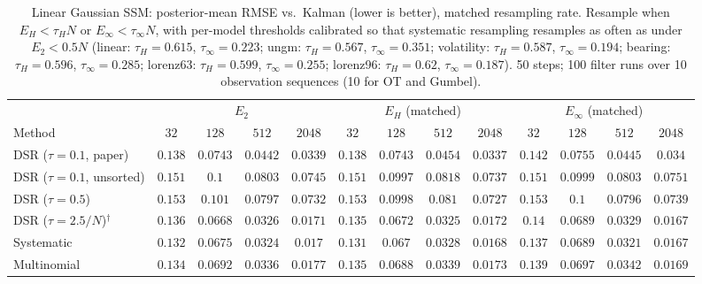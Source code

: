 \begin{table}[ht]
\centering
\small
\caption{Linear Gaussian SSM: posterior-mean RMSE vs.\ Kalman (lower is better), matched resampling rate. Resample when $E_H<\tau_HN$ or $E_\infty<\tau_\infty N$, with per-model thresholds calibrated so that systematic resampling resamples as often as under $E_2<0.5N$ (linear: $\tau_H{=}0.615$, $\tau_\infty{=}0.223$; ungm: $\tau_H{=}0.567$, $\tau_\infty{=}0.351$; volatility: $\tau_H{=}0.587$, $\tau_\infty{=}0.194$; bearing: $\tau_H{=}0.596$, $\tau_\infty{=}0.285$; lorenz63: $\tau_H{=}0.599$, $\tau_\infty{=}0.255$; lorenz96: $\tau_H{=}0.62$, $\tau_\infty{=}0.187$). 50 steps; 100 filter runs over 10 observation sequences (10 for OT and Gumbel).}
\label{tab:trigger-matched-linear-posterior_mean_rmse}
\begin{adjustbox}{max width=\linewidth}
\begin{tabular}{lcccc|cccc|cccc}
\toprule
 & \multicolumn{4}{c}{$E_2$} & \multicolumn{4}{c}{$E_H$ (matched)} & \multicolumn{4}{c}{$E_\infty$ (matched)} \\
\cmidrule(lr){2-5} \cmidrule(lr){6-9} \cmidrule(lr){10-13}
Method & $32$ & $128$ & $512$ & $2048$ & $32$ & $128$ & $512$ & $2048$ & $32$ & $128$ & $512$ & $2048$ \\
\midrule
DSR ($\tau{=}0.1$, paper) & $\mathbf{0.138}$ & $\mathbf{0.0743}$ & $\mathbf{0.0442}$ & $0.0339$ & $0.138$ & $0.0743$ & $0.0454$ & $\mathbf{0.0337}$ & $0.142$ & $0.0755$ & $0.0445$ & $0.034$ \\
DSR ($\tau{=}0.1$, unsorted) & $\mathbf{0.151}$ & $0.1$ & $\mathbf{0.0803}$ & $0.0745$ & $0.151$ & $\mathbf{0.0997}$ & $0.0818$ & $\mathbf{0.0737}$ & $0.151$ & $0.0999$ & $0.0803$ & $0.0751$ \\
DSR ($\tau{=}0.5$) & $0.153$ & $0.101$ & $0.0797$ & $0.0732$ & $\mathbf{0.153}$ & $\mathbf{0.0998}$ & $0.081$ & $\mathbf{0.0727}$ & $0.153$ & $0.1$ & $\mathbf{0.0796}$ & $0.0739$ \\
DSR ($\tau{=}2.5/N$)$^\dagger$ & $0.136$ & $\mathbf{0.0668}$ & $0.0326$ & $0.0171$ & $\mathbf{0.135}$ & $0.0672$ & $\mathbf{0.0325}$ & $0.0172$ & $0.14$ & $0.0689$ & $0.0329$ & $\mathbf{0.0167}$ \\
\midrule
Systematic & $0.132$ & $0.0675$ & $0.0324$ & $0.017$ & $\mathbf{0.131}$ & $\mathbf{0.067}$ & $0.0328$ & $0.0168$ & $0.137$ & $0.0689$ & $\mathbf{0.0321}$ & $\mathbf{0.0167}$ \\
Multinomial & $\mathbf{0.134}$ & $0.0692$ & $\mathbf{0.0336}$ & $0.0177$ & $0.135$ & $\mathbf{0.0688}$ & $0.0339$ & $0.0173$ & $0.139$ & $0.0697$ & $0.0342$ & $\mathbf{0.0169}$ \\

\end{tabular}
\end{adjustbox}
\end{table}
